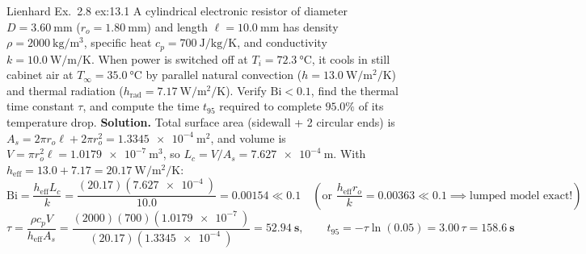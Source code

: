 \begin{workedexample}{Lienhard Ex.\ 2.8 }{ex:13.1}
A cylindrical electronic resistor of diameter $D = \SI{3.60}{\milli\meter}$ ($r_o = \SI{1.80}{\milli\meter}$) and length $\ell = \SI{10.0}{\milli\meter}$ has density $\rho = \SI{2000}{\kilogram\per\cubic\meter}$, specific heat $c_p = \SI{700}{\joule\per\kilogram\per\kelvin}$, and conductivity $k = \SI{10.0}{\watt\per\meter\per\kelvin}$. When power is switched off at $T_i = \SI{72.3}{\celsius}$, it cools in still cabinet air at $T_\infty = \SI{35.0}{\celsius}$ by parallel natural convection ($h = \SI{13.0}{\watt\per\square\meter\per\kelvin}$) and thermal radiation ($h_{\mathrm{rad}} = \SI{7.17}{\watt\per\square\meter\per\kelvin}$). Verify $\mathrm{Bi} < 0.1$, find the thermal time constant $\tau$, and compute the time $t_{95}$ required to complete $95.0\%$ of its temperature drop.
\tcblower
\textbf{Solution.} Total surface area (sidewall + 2 circular ends) is $A_s = 2\pi r_o \ell + 2\pi r_o^2 = \SI{1.3345e-4}{\square\meter}$, and volume is $V = \pi r_o^2 \ell = \SI{1.0179e-7}{\cubic\meter}$, so $L_c = V/A_s = \SI{7.627e-4}{\meter}$. With $h_{\mathrm{eff}} = 13.0 + 7.17 = \SI{20.17}{\watt\per\square\meter\per\kelvin}$:
\[
  \mathrm{Bi} = \frac{h_{\mathrm{eff}} L_c}{k} = \frac{(20.17)(\SI{7.627e-4}{})}{10.0} = \mathbf{0.00154 \ll 0.1} \quad (\text{or } \frac{h_{\mathrm{eff}} r_o}{k} = 0.00363 \ll 0.1 \implies \text{lumped model exact!})
\]
\[
  \tau = \frac{\rho c_p V}{h_{\mathrm{eff}} A_s} = \frac{(2000)(700)(\SI{1.0179e-7}{})}{(20.17)(\SI{1.3345e-4}{})} = \mathbf{\SI{52.94}{\second}}, \qquad
  t_{95} = -\tau\ln(0.05) = 3.00\,\tau = \mathbf{\SI{158.6}{\second}}
\]
\end{workedexample}

